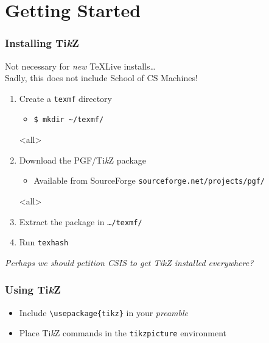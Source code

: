\mode*		%
\section{Getting Started}
\begin{frame}
	\frametitle{Installing Ti\emph{k}Z}

	Not necessary for \emph{new} TeXLive installs\ldots\\
	Sadly, this does not include School of CS Machines!

	\pause

	\begin{enumerate}
		\item Create a \texttt{texmf} directory
		\mode<article>
		\begin{itemize}
			\item \texttt{\$ mkdir \textasciitilde/texmf/}
		\end{itemize}

		\pause

		\item Download the PGF/Ti\emph{k}Z package
		\mode<article>
		\begin{itemize}
			\item Available from SourceForge \texttt{sourceforge.net/projects/pgf/}
		\end{itemize}

		\pause

		\item Extract the package in \texttt{\ldots/texmf/}

		\pause

		\item Run \texttt{texhash}
	\end{enumerate}
\end{frame}

\textit{Perhaps we should petition CSIS to get TikZ installed everywhere?}

\begin{frame}
	\frametitle{Using Ti\emph{k}Z}
	\begin{itemize}
		\item Include \texttt{\textbackslash usepackage\{tikz\}} in your \textit{preamble}
		\item Place Ti\emph{k}Z commands in the \texttt{tikzpicture} environment
	\end{itemize}
	
\end{frame}

